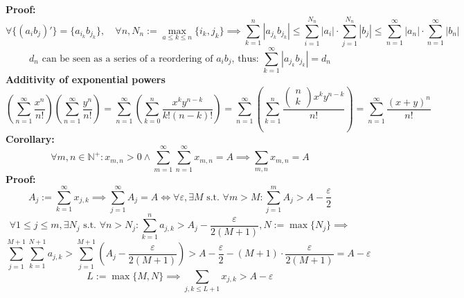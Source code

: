 \documentclass{article}
\newcommand{\N}{\mathbb{N}}
\newcommand{\st}{\mbox{ s.t. }}
\newcommand{\0}{{\bf{0}}}
\begin{document}
\textbf{Proof:}
$$\forall\{(a_ib_j)'\}=\{a_{i_k}b_{j_k}\},\quad\forall n,N_n:=\max_{a\le k\le n}\{i_k,j_k\}\implies\sum_{k=1}^n|a_{j_k}b_{j_k}|\le\sum_{i=1}^{N_n}|a_i|\cdot\sum_{j=1}^{N_n}|b_j|\le\sum_{n=1}^\infty|a_n|\cdot\sum_{n=1}^\infty|b_n|$$
$$d_n\mbox{ can be seen as a series of a reordering of }a_ib_j\mbox{, thus: }\sum_{k=1}^\infty|a_{j_k}b_{j_k}|=d_n$$
\textbf{Additivity of exponential powers}
$$\left(\sum_{n=1}^\infty\frac{x^n}{n!}\right)\left(\sum_{n=1}^\infty\frac{y^n}{n!}\right)=\sum_{n=1}^\infty\left(\sum_{k=0}^n\frac{x^ky^{n-k}}{k!(n-k)!}\right)=\sum_{n=1}^\infty\left(\sum_{k=1}^n\frac{\begin{pmatrix}
n\\
k
\end{pmatrix}x^ky^{n-k}}{n!}\right)=\sum_{n=1}^\infty\frac{(x+y)^n}{n!}$$
\textbf{Corollary:}
$$\forall m,n\in\N^+:x_{m,n}>0\land\sum_{m=1}^\infty\sum_{n=1}^\infty x_{m,n}=A\implies\sum_{m,n}x_{m,n}=A$$
\textbf{Proof:}
$$A_j:=\sum\limits_{k=1}^\infty x_{j,k}\implies\sum_{j=1}^\infty A_j=A\iff\forall\varepsilon,\exists M\st\forall m>M:\sum_{j=1}^mA_j>A-\frac{\varepsilon}{2}$$
$$\forall1\le j\le m,\exists N_j\st\forall n>N_j:\sum_{k=1}^n a_{j,k}>A_j-\frac{\varepsilon}{2(M+1)},N:=\max\{N_j\}\implies$$
$$\sum_{j=1}^{M+1}\sum_{k=1}^{N+1}a_{j,k}>\sum_{j=1}^{M+1}\left(A_j-\frac{\varepsilon}{2(M+1)}\right)>A-\frac{\varepsilon}{2}-(M+1)\cdot\frac{\varepsilon}{2(M+1)}=A-\varepsilon$$
$$L:=\max\{M,N\}\implies\sum_{j,k\le L+1}x_{j,k}>A-\varepsilon$$
\end{document}
